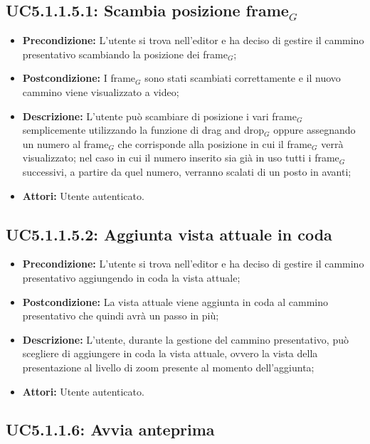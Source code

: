 \subsection{ UC5.1.1.5.1: Scambia posizione frame$_G$}

\begin{itemize}
	\item \textbf{Precondizione:} L’utente si trova nell’editor e ha deciso di gestire il cammino presentativo scambiando la posizione dei frame$_G$;
	\item \textbf{Postcondizione:} I frame$_G$ sono stati scambiati correttamente e il nuovo cammino viene visualizzato a video;
	\item \textbf{Descrizione:} L’utente può scambiare di posizione i vari frame$_G$ semplicemente utilizzando la funzione di drag and drop$_G$ oppure assegnando un numero al frame$_G$ che corrisponde alla posizione in cui il frame$_G$ verrà visualizzato; nel caso in cui il numero inserito sia già in uso tutti i frame$_G$ successivi, a partire da quel numero, verranno scalati di un posto in avanti;
	\item \textbf{Attori:} Utente autenticato.
\end{itemize}
\subsection{ UC5.1.1.5.2: Aggiunta vista attuale in coda}

\begin{itemize}
	\item \textbf{Precondizione:} L’utente si trova nell’editor e ha deciso di gestire il cammino presentativo aggiungendo in coda la vista attuale;
	\item \textbf{Postcondizione:} La vista attuale viene aggiunta in coda al cammino presentativo che quindi avrà un passo in più;
	\item \textbf{Descrizione:} L’utente, durante la gestione del cammino presentativo, può scegliere di aggiungere in coda la vista attuale, ovvero la vista della presentazione al livello di zoom presente al momento dell’aggiunta;
	\item \textbf{Attori:} Utente autenticato.
\end{itemize}
\subsection{ UC5.1.1.6: Avvia anteprima}

